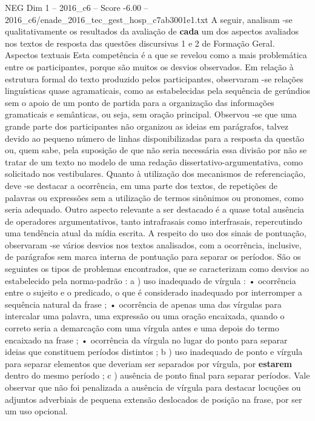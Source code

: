 \begin{textsample}{NEG Dim 1 – 2016\_c6 – Score -6.00 – 2016\_c6/enade\_2016\_tec\_gest\_hosp\_c7ab3001e1.txt}
A seguir, analisam -se qualitativamente os resultados da avaliação de \textbf{cada} um dos aspectos avaliados nos textos de resposta das questões discursivas 1 e 2 de Formação Geral.
Aspectos textuais Esta competência é a que se revelou como a mais problemática entre os participantes, porque são muitos os desvios observados.
Em relação à estrutura formal do texto produzido pelos participantes, observaram -se relações linguísticas quase agramaticais, como as estabelecidas pela sequência de gerúndios sem o apoio de um ponto de partida para a organização das informações gramaticais e semânticas, ou seja, sem oração principal.
Observou -se que uma grande parte dos participantes não organizou as ideias em parágrafos, talvez devido ao pequeno número de linhas disponibilizadas para a resposta da questão ou, quem sabe, pela suposição de que não seria necessária essa divisão por não se tratar de um texto no modelo de uma redação dissertativo-argumentativa, como solicitado nos vestibulares.
Quanto à utilização dos mecanismos de referenciação, deve -se destacar a ocorrência, em uma parte dos textos, de repetições de palavras ou expressões sem a utilização de termos sinônimos ou pronomes, como seria adequado.
Outro aspecto relevante a ser destacado é a quase total ausência de operadores argumentativos, tanto intrafrasais como interfrasais, repercutindo uma tendência atual da mídia escrita.
A respeito do uso dos sinais de pontuação, observaram -se vários desvios nos textos analisados, com a ocorrência, inclusive, de parágrafos sem marca interna de pontuação para separar os períodos.
São os seguintes os tipos de problemas encontrados, que se caracterizam como desvios ao estabelecido pela norma-padrão : a ) uso inadequado de vírgula : • ocorrência entre o sujeito e o predicado, o que é considerado inadequado por interromper a sequência natural da frase ; • ocorrência de apenas uma das vírgulas para intercalar uma palavra, uma expressão ou uma oração encaixada, quando o correto seria a demarcação com uma vírgula antes e uma depois do termo encaixado na frase ; • ocorrência da vírgula no lugar do ponto para separar ideias que constituem períodos distintos ; b ) uso inadequado de ponto e vírgula para separar elementos que deveriam ser separados por vírgula, por \textbf{estarem} dentro do mesmo período ; c ) ausência de ponto final para separar períodos.
Vale observar que não foi penalizada a ausência de vírgula para destacar locuções ou adjuntos adverbiais de pequena extensão deslocados de posição na frase, por ser um uso opcional.

\end{textsample}
